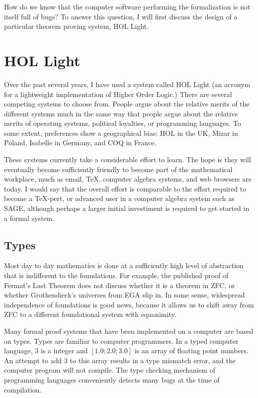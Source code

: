 \documentclass{llncs}
\begin{document}

How do we know that the computer software performing the formalization
is not itself full of bugs?  To answer this question, I will first discuss
the design of a particular theorem proving system, HOL Light.

\section{HOL Light}

Over the past several years, I have used a system called HOL Light  
(an acronym for a lightweight implementation of Higher Order Logic.)  There are several competing systems to choose from. %
People argue about the relative merits of the
different systems much in the same way that people argue about the relative merits
of operating systems, political loyalties, or programming languages.  To some extent, preferences
show a geographical bias:  HOL in the UK, Mizar in Poland, Isabelle in Germany, and
COQ in France.



These systems currently take a considerable effort to learn.  The hope
is they will eventually become sufficiently friendly
to become part of the 
mathematical workplace, much as email, \TeX\relax, computer algebra systems, and
web browsers are today.
I would say that the overall effort is comparable to the effort required to become a \TeX\relax-pert,
or advanced user in a computer algebra system such as SAGE, although
perhaps a larger initial investiment is required to get started in a
formal system.

\subsection{Types}

Most day to day mathematics is done at a sufficiently high level of abstraction that is
indifferent to the foundations.  For example, the published proof
of Fermat's Last Theorem does not discuss whether it is a theorem
in ZFC, or whether Grothendieck's universes from EGA slip in. In some sense, widespread independence of foundations is good news, because it allows us to shift
away from ZFC to a different foundational system with equanimity.  

Many
formal proof systems that have been implemented on a computer are based on
types.  Types are familiar to computer programmers.  In a typed computer language,
$3$ is a integer and $[1.0;2.0;3.0]$ is an array of floating point numbers. An attempt
to add $3$ to this array results in a type mismatch error, and the computer program
will not compile.  The type checking mechanism of programming languages
conveniently detects many bugs at the time
of compilation.  %
\end{document}
